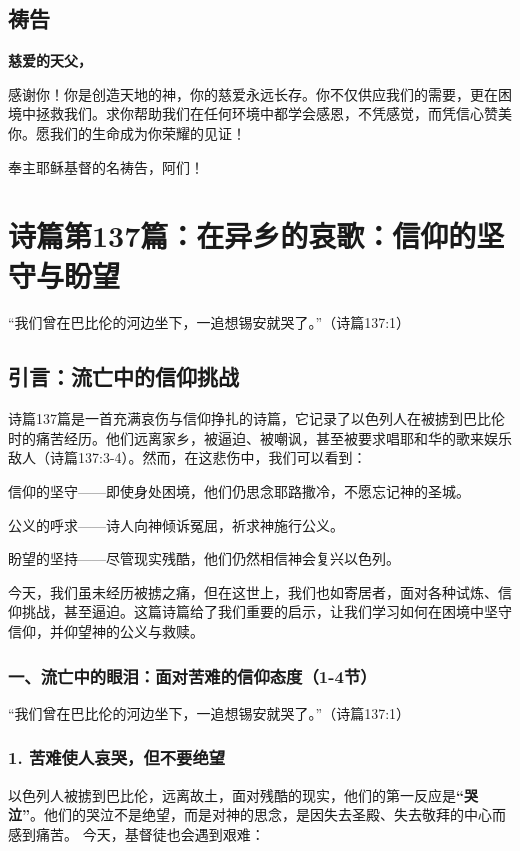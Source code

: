 \documentclass[a4paper, 12pt]{article}
\begin{document}
\subsection*{祷告}
\textbf{慈爱的天父，}

感谢你！你是创造天地的神，你的慈爱永远长存。你不仅供应我们的需要，更在困境中拯救我们。求你帮助我们在任何环境中都学会感恩，不凭感觉，而凭信心赞美你。愿我们的生命成为你荣耀的见证！

奉主耶稣基督的名祷告，阿们！
\newpage
\section{诗篇第137篇：在异乡的哀歌：信仰的坚守与盼望}


“我们曾在巴比伦的河边坐下，一追想锡安就哭了。”（诗篇137:1）

\subsection*{引言：流亡中的信仰挑战}
诗篇137篇是一首充满哀伤与信仰挣扎的诗篇，它记录了以色列人在被掳到巴比伦时的痛苦经历。他们远离家乡，被逼迫、被嘲讽，甚至被要求唱耶和华的歌来娱乐敌人（诗篇137:3-4）。然而，在这悲伤中，我们可以看到：

信仰的坚守——即使身处困境，他们仍思念耶路撒冷，不愿忘记神的圣城。

公义的呼求——诗人向神倾诉冤屈，祈求神施行公义。

盼望的坚持——尽管现实残酷，他们仍然相信神会复兴以色列。

今天，我们虽未经历被掳之痛，但在这世上，我们也如寄居者，面对各种试炼、信仰挑战，甚至逼迫。这篇诗篇给了我们重要的启示，让我们学习如何在困境中坚守信仰，并仰望神的公义与救赎。

\subsubsection*{一、流亡中的眼泪：面对苦难的信仰态度（1-4节）}
“我们曾在巴比伦的河边坐下，一追想锡安就哭了。”（诗篇137:1）

\subsubsection*{1. 苦难使人哀哭，但不要绝望}
以色列人被掳到巴比伦，远离故土，面对残酷的现实，他们的第一反应是\textbf{“哭泣”}。他们的哭泣不是绝望，而是对神的思念，是因失去圣殿、失去敬拜的中心而感到痛苦。
今天，基督徒也会遇到艰难：
\end{document}

